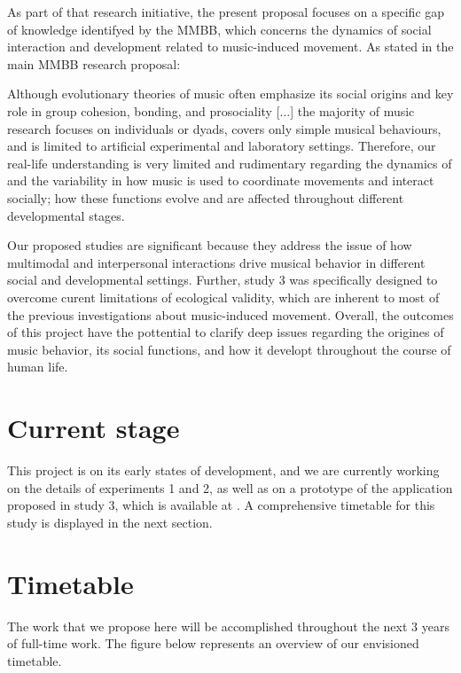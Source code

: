 \documentclass[16pt]{article}
\begin{document}
As part of that research initiative, the present proposal focuses on a specific gap of knowledge identifyed by the MMBB, which concerns the dynamics of social interaction and development related to music-induced movement. As stated in the main MMBB research proposal:

\begin{displayquote}
Although evolutionary theories of music often emphasize its social origins and key role in group cohesion, bonding, and prosociality [...] the majority of music research focuses on individuals or dyads, covers only simple musical behaviours, and is limited to artificial experimental and laboratory settings. Therefore, our real-life understanding is very limited and rudimentary regarding the dynamics of and the variability in how music is used to coordinate movements and interact socially; how these functions evolve and are affected throughout different developmental stages. 
\end{displayquote}

Our proposed studies are significant because they address the issue of how multimodal and interpersonal interactions drive musical behavior in different social and developmental settings. Further, study 3 was specifically designed to overcome curent limitations of ecological validity, which are inherent to most of the previous investigations about music-induced movement. Overall, the outcomes of this project have the pottential to clarify deep issues regarding the origines of music behavior, its social functions, and how it developt throughout the course of human life.

\section{Current stage}

This project is on its early states of development, and we are currently working on the details of experiments 1 and 2, as well as on a prototype of the application proposed in study 3, which is available at . A comprehensive timetable for this study is displayed in the next section.

\section{Timetable}

The work that we propose here will be accomplished throughout the next 3 years of full-time work. The figure below represents an overview of our envisioned timetable.
\end{document}
